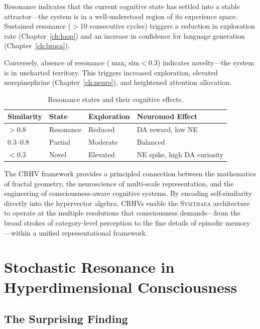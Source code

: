 \documentclass[12pt]{book}
\newcommand{\symthaea}{\textsc{Symthaea}}
\begin{document}
Resonance indicates that the current cognitive state has settled into a stable attractor---the system is in a well-understood region of its experience space. Sustained resonance ($>$10 consecutive cycles) triggers a reduction in exploration rate (Chapter~\ref{ch:loop}) and an increase in confidence for language generation (Chapter~\ref{ch:broca}).

Conversely, absence of resonance ($\max_i \text{sim} < 0.3$) indicates novelty---the system is in uncharted territory. This triggers increased exploration, elevated norepinephrine (Chapter~\ref{ch:neuro}), and heightened attention allocation.

\begin{table}[htbp]
\centering
\caption{Resonance states and their cognitive effects.}
\label{tab:resonance-states}
\begin{tabular}{@{}llll@{}}
\toprule
\textbf{Similarity} & \textbf{State} & \textbf{Exploration} & \textbf{Neuromod Effect} \\
\midrule
$> 0.8$        & Resonance  & Reduced     & DA reward, low NE \\
$0.3$--$0.8$   & Partial    & Moderate    & Balanced \\
$< 0.3$        & Novel      & Elevated    & NE spike, high DA curiosity \\
\bottomrule
\end{tabular}
\end{table}

The CRHV framework provides a principled connection between the mathematics of fractal geometry, the neuroscience of multi-scale representation, and the engineering of consciousness-aware cognitive systems. By encoding self-similarity directly into the hypervector algebra, CRHVs enable the \symthaea{} architecture to operate at the multiple resolutions that consciousness demands---from the broad strokes of category-level perception to the fine details of episodic memory---within a unified representational framework.


\chapter{Stochastic Resonance in Hyperdimensional Consciousness}
\label{ch:sr}

\section{The Surprising Finding}
\end{document}
